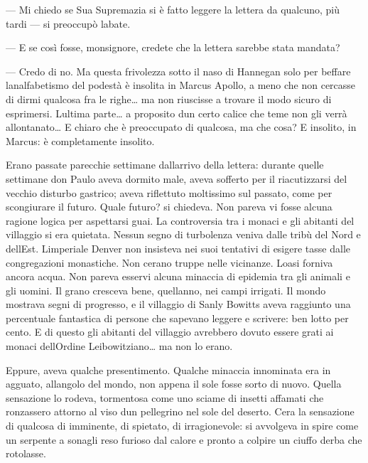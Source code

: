 --- Mi chiedo se Sua Supremazia si è fatto leggere la lettera da
qualcuno, più tardi --- si preoccupò l\textquotesingle abate.

--- E se così fosse, monsignore, credete che la lettera sarebbe stata
mandata?

--- Credo di no. Ma questa frivolezza sotto il naso di Hannegan solo per
beffare l\textquotesingle analfabetismo del podestà è insolita in Marcus
Apollo, a meno che non cercasse di dirmi qualcosa fra le righe\ldots{}
ma non riuscisse a trovare il modo sicuro di esprimersi.
L\textquotesingle ultima parte\ldots{} a proposito d\textquotesingle un
certo calice che teme non gli verrà allontanato\ldots{} E chiaro che è
preoccupato di qualcosa, ma che cosa? E insolito, in Marcus: è
completamente insolito.

Erano passate parecchie settimane dall\textquotesingle arrivo della
lettera: durante quelle settimane don Paulo aveva dormito male, aveva
sofferto per il riacutizzarsi del vecchio disturbo gastrico; aveva
riflettuto moltissimo sul passato, come per scongiurare il futuro. Quale
futuro? si chiedeva. Non pareva vi fosse alcuna ragione logica per
aspettarsi guai. La controversia tra i monaci e gli abitanti del
villaggio si era quietata. Nessun segno di turbolenza veniva dalle tribù
del Nord e dell\textquotesingle Est. L\textquotesingle imperiale Denver
non insisteva nei suoi tentativi di esigere tasse dalle congregazioni
monastiche. Non c\textquotesingle erano truppe nelle vicinanze.
L\textquotesingle oasi forniva ancora acqua. Non pareva esservi alcuna
minaccia di epidemia tra gli animali e gli uomini. Il grano cresceva
bene, quell\textquotesingle anno, nei campi irrigati. Il mondo mostrava
segni di progresso, e il villaggio di Sanly Bowitts aveva raggiunto una
percentuale fantastica di persone che sapevano leggere e scrivere: ben
l\textquotesingle otto per cento. E di questo gli abitanti del villaggio
avrebbero dovuto essere grati ai monaci dell\textquotesingle Ordine
Leibowitziano\ldots{} ma non lo erano.

Eppure, aveva qualche presentimento. Qualche minaccia innominata era in
agguato, all\textquotesingle angolo del mondo, non appena il sole fosse
sorto di nuovo. Quella sensazione lo rodeva, tormentosa come uno sciame
di insetti affamati che ronzassero attorno al viso d\textquotesingle un
pellegrino nel sole del deserto. C\textquotesingle era la sensazione di
qualcosa di imminente, di spietato, di irragionevole: si avvolgeva in
spire come un serpente a sonagli reso furioso dal calore e pronto a
colpire un ciuffo d\textquotesingle erba che rotolasse.

